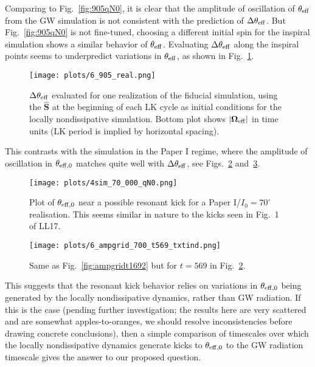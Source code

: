 \documentclass[11pt,
        usenames, %
        dvipsnames %
    ]{article}
\newcommand*{\bm}[1]{\boldsymbol{\mathbf{#1}}}
\newcommand*{\uv}[1]{\hat{\bm{#1}}}
\newcommand*{\abs}[1]{\left|#1\right|}
\begin{document}
Comparing to Fig.~\ref{fig:905qN0}, it is clear that the amplitude of
oscillation of $\theta_{\rm eff}$ from the GW simulation is not consistent
with the prediction of $\Delta \theta_{\rm eff}$. But Fig.~\ref{fig:905qN0}
is not fine-tuned, choosing a different initial spin for the inspiral simulation
shows a similar behavior of $\theta_{\rm eff}$. Evaluating $\Delta
\theta_{\rm eff}$ along the inspiral points seems to underpredict variations
in $\theta_{\rm eff}$, as shown in Fig.~\ref{fig:6_905real}.
\begin{figure}
    \centering
    \texttt{[image: plots/6\_905\_real.png]}
    \caption{$\Delta \theta_{\rm eff}$ evaluated for one realization of the
    fiducial simulation, using the $\uv{S}$ at the beginning of each LK cycle as
    initial conditions for the locally nondissipative
    simulation. Bottom plot shows $\abs{\bm{\Omega}_{\rm eff} }$ in time
    units (LK period is implied by horizontal spacing).}\label{fig:6_905real}
\end{figure}

This contrasts with the simulation in the Paper I regime, where the amplitude of
oscillation in $\theta_{\rm eff, 0}$ matches quite well with $\Delta \theta_{\rm
eff}$, see Figs.~\ref{fig:4_70_qN0} and~\ref{fig:ampgrid_569}.
\begin{figure}
    \centering
    \texttt{[image: plots/4sim\_70\_000\_qN0.png]}
    \caption{Plot of $\theta_{\rm eff, 0}$ near a possible resonant kick for a
    Paper I/$I_0 = 70^\circ$ realisation. This seems similar in nature to the
    kicks seen in Fig.~1 of LL17.}\label{fig:4_70_qN0}
\end{figure}
\begin{figure}
    \centering
    \texttt{[image: plots/6\_ampgrid\_700\_t569\_txtind.png]}
    \caption{Same as Fig.~\ref{fig:ampgridt1692} but for $t = 569$ in
    Fig.~\ref{fig:4_70_qN0}.}\label{fig:ampgrid_569}
\end{figure}

This suggests that the resonant kick behavior relies on variations in
$\theta_{\rm eff, 0}$ being generated by the locally nondissipative dynamics,
rather than GW radiation. If this is the case (pending further investigation;
the results here are very scattered and are somewhat apples-to-oranges, we
should resolve inconsistencies before drawing concrete conclusions), then a
simple comparison of timescales over which the locally nondissipative dynamics
generate kicks to $\theta_{\rm eff, 0}$ to the GW radiation timescale gives the
answer to our proposed question.
\end{document}
